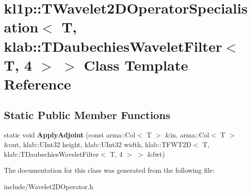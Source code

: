 \hypertarget{classkl1p_1_1TWavelet2DOperatorSpecialisation_3_01T_00_01klab_1_1TDaubechiesWaveletFilter_3_01T_00_014_01_4_01_4}{}\section{kl1p\+:\+:T\+Wavelet2\+D\+Operator\+Specialisation$<$ T, klab\+:\+:T\+Daubechies\+Wavelet\+Filter$<$ T, 4 $>$ $>$ Class Template Reference}
\label{classkl1p_1_1TWavelet2DOperatorSpecialisation_3_01T_00_01klab_1_1TDaubechiesWaveletFilter_3_01T_00_014_01_4_01_4}
\subsection*{Static Public Member Functions}
\begin{DoxyCompactItemize}
\item 
static void {\bfseries Apply\+Adjoint} (const arma\+::\+Col$<$ T $>$ \&in, arma\+::\+Col$<$ T $>$ \&out, klab\+::\+U\+Int32 height, klab\+::\+U\+Int32 width, klab\+::\+T\+F\+W\+T2D$<$ T, klab\+::\+T\+Daubechies\+Wavelet\+Filter$<$ T, 4 $>$ $>$ \&fwt)\hypertarget{classkl1p_1_1TWavelet2DOperatorSpecialisation_3_01T_00_01klab_1_1TDaubechiesWaveletFilter_3_01T_00_014_01_4_01_4_a5b20b6d89836df2d79927bc7b43bb2e7}{}\label{classkl1p_1_1TWavelet2DOperatorSpecialisation_3_01T_00_01klab_1_1TDaubechiesWaveletFilter_3_01T_00_014_01_4_01_4_a5b20b6d89836df2d79927bc7b43bb2e7}

\end{DoxyCompactItemize}


The documentation for this class was generated from the following file\+:\begin{DoxyCompactItemize}
\item 
include/Wavelet2\+D\+Operator.\+h\end{DoxyCompactItemize}
